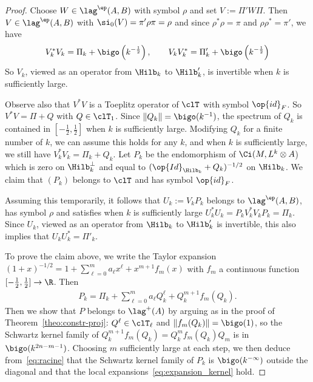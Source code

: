 \begin{proof}
Choose $W \in \lag^{\ep} (A,B)$ with symbol $\rho$ and set $V := \Pi' W \Pi$. Then $V
\in \lag^{\ep} (A,B)$ with $ \si_0(V) = \pi' \rho \pi = \rho$ and since $\rho^* \rho =
\pi$ and $\rho \rho^* = \pi'$, we have
\begin{gather}\label{eq:first_Step}
V^*_k V_k = \Pi_k + \bigo \left(k^{-\frac{1}{2}}\right), \qquad V_k V^*_k = \Pi_k' + \bigo \left(k^{-\frac{1}{2}}\right)
\end{gather}
So $V_k$, viewed as an operator from $\Hilb_k$ to $\Hilb_k'$, is invertible when $k$ is sufficiently large.

Observe also that $V^*V$ is a Toeplitz operator of $\clT$ with symbol $\op{id}_{F}$. So $V^*V = \Pi + Q$ with $Q \in
\clT_1$. Since $\| Q_k\| = \bigo (k^{-1})$, the spectrum of $Q_k$ is contained in $[-\frac{1}{2}, \frac{1}{2}]$ when $k$ is sufficiently large. Modifying $Q_k$ for a finite number of $k$, we can assume this holds for any $k$, and when $k$ is sufficiently large, we still have $V_k^*V_k = \Pi_k + Q_k$. Let $P_k$ be the endomorphism of $\Ci (M, L^k \otimes A$) which is zero on $\Hilb_k^{\perp}$ and equal to $(\op{Id}_{\Hilb_k} + Q_k) ^{-1/2}$ on $\Hilb_k$. We claim that $(P_k)$ belongs to $\clT$ and has symbol $\op{id}_{F}$.

Assuming this temporarily, it follows that $U_k := V_k P_k $ belongs to $\lag ^{\ep} (A,B)$, has symbol $\rho$ and satisfies when $k$ is sufficiently large $U_k^* U_k = P_k V_k^* V_k P_k = \Pi_k$. Since $U_k$, viewed as an operator from $\Hilb_k$ to $\Hilb'_k$ is invertible, this also implies that $U_kU_k^* = \Pi'_k$.

To prove the claim above, we write the Taylor expansion $(1+x)^{-1/2} = 1 +
\sum_{\ell = 0 }^m a_\ell x^\ell + x^{m+1} f_m (x)$ with $f_m$ a continuous function $[-\frac{1}{2},\frac{1}{2}] \rightarrow \R$. Then
\begin{gather}\label{eq:racine}
P_k = \Pi_k + \sum_{\ell = 0 }^m a_\ell Q_k^{\ell} + Q_k^{m+1} f_m (Q_k).
\end{gather}
Then we show that $P$ belongs to $\lag ^+ (A)$ by arguing as in the proof of Theorem~\ref{theo:constr-proj}: $Q^\ell \in \clT_\ell $ and $\| f_m (Q_k) \| = \bigo (1)$, so the Schwartz kernel family of $Q_k^{m+1} f_m (Q_k) = Q_k^m f_m (Q_k) Q_m$ is in $\bigo (k^{2n - m-1 })$. Choosing $m$ sufficiently large at each step, we then deduce from~\eqref{eq:racine} that the Schwartz kernel family of $P_k $ is $\bigo (k^{-\infty})$ outside the diagonal and that the local expansions~\eqref{eq:expansion_kernel} hold.


\end{proof}
